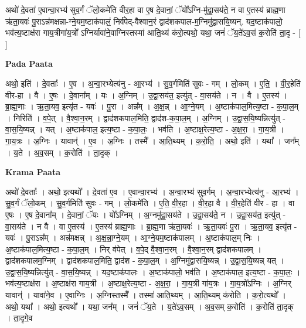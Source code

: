 \documentclass[17pt]{extarticle}
\begin{document}
अथो॑ दे॒वता॑ ए॒वान्वा॒रभ्य॑ सुव॒र्गं ॅलो॒कमे॑ति वीर॒हा वा ए॒ष दे॒वानां॒ ॅयो᳚ऽग्नि-मु॑द्वा॒सय॑ते॒ न वा ए॒तस्य॑ ब्राह्म॒णा ऋ॑ता॒यवः॑ पु॒राऽन्न॑मक्षन्ना-ग्ने॒यम॒ष्टाक॑पालं॒ निर्व॑पेद्-वैश्वान॒रं द्वाद॑शकपाल-म॒ग्निमु॑द्वासयि॒ष्यन्. यद॒ष्टाक॑पालो॒ भव॑त्य॒ष्टाक्ष॑रा गाय॒त्रीगा॑य॒त्रो᳚ ऽग्निर्यावा॑ने॒वाग्निस्तस्मा॑ आति॒थ्यं क॑रो॒त्यथो॒ यथा॒ जनं॑ ॅय॒ते॑ऽव॒सं क॒रोति॑ ता॒दृ - [  ] \newline

\textbf{Pada Paata} \newline

अथो॒ इति॑ । दे॒वताः᳚ । ए॒व । अ॒न्वा॒रभ्येत्य॑नु - आ॒रभ्य॑ । सु॒व॒र्गमिति॑ सुवः - गम् । लो॒कम् । ए॒ति॒ । वी॒र॒हेति॑ वीर-हा । वै । ए॒षः । दे॒वाना᳚म् । यः । अ॒ग्निम् । उ॒द्वा॒सय॑त॒ इत्यु॑त् - वा॒सय॑ते । न । वै । ए॒तस्य॑ । ब्रा॒ह्म॒णाः । ऋ॒ता॒यव॒ इत्यृ॑त - यवः॑ । पु॒रा । अन्न᳚म् । अ॒क्ष॒न्न् । आ॒ग्ने॒यम् । अ॒ष्टाक॑पाल॒मित्य॒ष्टा - क॒पा॒ल॒म् । निरिति॑ । व॒पे॒त् । वै॒श्वा॒न॒रम् । द्वाद॑शकपाल॒मिति॒ द्वाद॑श-क॒पा॒ल॒म् । अ॒ग्निम् । उ॒द्वा॒स॒यि॒ष्यन्नित्यु॑त् - वा॒स॒यि॒ष्यन्न् । यत् । अ॒ष्टाक॑पाल॒ इत्य॒ष्टा - क॒पा॒लः॒ । भव॑ति । अ॒ष्टाक्ष॒रेत्य॒ष्टा - अ॒क्ष॒रा॒ । गा॒य॒त्री । गा॒य॒त्रः । अ॒ग्निः । यावान्॑ । ए॒व । अ॒ग्निः । तस्मै᳚ । आ॒ति॒थ्यम् । क॒रो॒ति॒ । अथो॒ इति॑ । यथा᳚ । जन᳚म् । य॒ते । अ॒व॒सम् । क॒रोति॑ । ता॒दृक् ।  \newline


\textbf{Krama Paata} \newline

अथो॑ दे॒वताः᳚ । अथो॒ इत्यथो᳚ । दे॒वता॑ ए॒व । ए॒वान्वा॒रभ्य॑ । अ॒न्वा॒रभ्य॑ सुव॒र्गम् । अ॒न्वा॒रभ्येत्य॑नु - आ॒रभ्य॑ । सु॒व॒र्गं ॅलो॒कम् । सु॒व॒र्गमिति॑ सुवः - गम् । लो॒कमे॑ति । ए॒ति॒ वी॒र॒हा । वी॒र॒हा वै । वी॒र॒हेति॑ वीर - हा । वा ए॒षः । ए॒ष दे॒वाना᳚म् । दे॒वानां॒ ॅयः । यो᳚ऽग्निम् । अ॒ग्नमु॑द्वा॒सय॑ते । उ॒द्वा॒सय॑ते॒ न । उ॒द्वा॒सय॑त॒ इत्यु॑त् - वा॒सय॑ते । न वै । वा ए॒तस्य॑ । ए॒तस्य॑ ब्राह्म॒णाः । ब्रा॒ह्म॒णा ऋ॑ता॒यवः॑ । ऋ॒ता॒यवः॑ पु॒रा । ऋ॒ता॒यव॒ इत्यृ॑त - यवः॑ । पु॒राऽन्न᳚म् । अन्न॑मक्षन्न् । अ॒क्ष॒न्ना॒ग्ने॒यम् । आ॒ग्ने॒यम॒ष्टाक॑पालम् । अ॒ष्टाक॑पाल॒म् निः । अ॒ष्टाक॑पाल॒मित्य॒ष्टा - क॒पा॒ल॒म् । निर् व॑पेत् । व॒पे॒द् वै॒श्वा॒न॒रम् । वै॒श्वा॒न॒रम् द्वाद॑शकपालम् । द्वाद॑शकपालम॒ग्निम् । द्वाद॑शकपाल॒मिति॒ द्वाद॑श - क॒पा॒ल॒म् । अ॒ग्निमु॑द्वासयि॒ष्यन्न् । उ॒द्वा॒स॒यि॒ष्यन्न् यत् । उ॒द्वा॒स॒यि॒ष्यन्नित्यु॑त् - वा॒स॒यि॒ष्यन्न् । यद॒ष्टाक॑पालः । अ॒ष्टाक॑पालो॒ भव॑ति । अ॒ष्टाक॑पाल॒ इत्य॒ष्टा - क॒पा॒लः॒ । भव॑त्य॒ष्टाक्ष॑रा । अ॒ष्टाक्ष॑रा गाय॒त्री । अ॒ष्टाक्ष॒रेत्य॒ष्टा - अ॒क्ष॒रा॒ । गा॒य॒त्री गा॑य॒त्रः । गा॒य॒त्रो᳚ऽग्निः । अ॒ग्निर् यावान्॑ । यावा॑ने॒व । ए॒वाग्निः । अ॒ग्निस्तस्मै᳚ । तस्मा॑ आति॒थ्यम् । आ॒ति॒थ्यम् क॑रोति । क॒रो॒त्यथो᳚ । अथो॒ यथा᳚ । अथो॒ इत्यथो᳚ । यथा॒ जन᳚म् । जनं॑ ॅय॒ते । य॒ते॑ऽव॒सम् । अ॒व॒सम् क॒रोति॑ । क॒रोति॑ ता॒दृक् । ता॒दृगे॒व \newline
\end{document}
